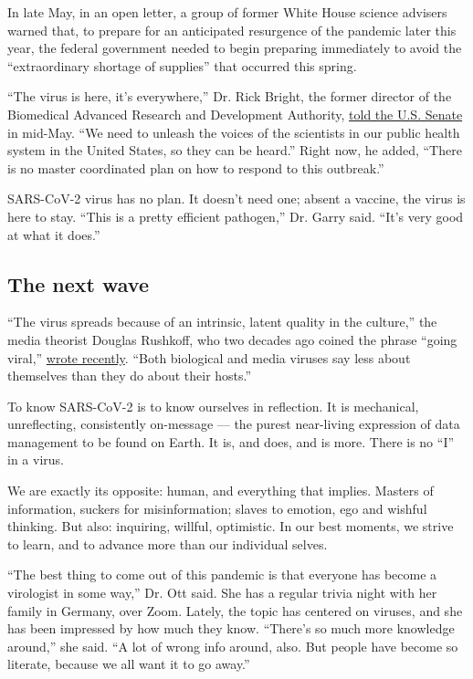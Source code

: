 In late May, in an open letter, a group of former White House science
advisers warned that, to prepare for an anticipated resurgence of the
pandemic later this year, the federal government needed to begin
preparing immediately to avoid the ``extraordinary shortage of
supplies'' that occurred this spring.

``The virus is here, it's everywhere,'' Dr. Rick Bright, the former
director of the Biomedical Advanced Research and Development Authority,
\href{https://www.rev.com/blog/transcripts/dr-rick-bright-testimony-transcript-vaccine-expert-whistleblower-ousted-by-trump-testifies}{told
the U.S. Senate} in mid-May. ``We need to unleash the voices of the
scientists in our public health system in the United States, so they can
be heard.'' Right now, he added, ``There is no master coordinated plan
on how to respond to this outbreak.''

SARS-CoV-2 virus has no plan. It doesn't need one; absent a vaccine, the
virus is here to stay. ``This is a pretty efficient pathogen,'' Dr.
Garry said. ``It's very good at what it does.''

\hypertarget{the-next-wave}{%
\subsection{The next wave}\label{the-next-wave}}

``The virus spreads because of an intrinsic, latent quality in the
culture,'' the media theorist Douglas Rushkoff, who two decades ago
coined the phrase ``going viral,''
\href{https://rushkoff.com/digital-trends-trump-media-virus/}{wrote
recently}. ``Both biological and media viruses say less about themselves
than they do about their hosts.''

To know SARS-CoV-2 is to know ourselves in reflection. It is mechanical,
unreflecting, consistently on-message --- the purest near-living
expression of data management to be found on Earth. It is, and does, and
is more. There is no ``I'' in a virus.

We are exactly its opposite: human, and everything that implies. Masters
of information, suckers for misinformation; slaves to emotion, ego and
wishful thinking. But also: inquiring, willful, optimistic. In our best
moments, we strive to learn, and to advance more than our individual
selves.

``The best thing to come out of this pandemic is that everyone has
become a virologist in some way,'' Dr. Ott said. She has a regular
trivia night with her family in Germany, over Zoom. Lately, the topic
has centered on viruses, and she has been impressed by how much they
know. ``There's so much more knowledge around,'' she said. ``A lot of
wrong info around, also. But people have become so literate, because we
all want it to go away.''

